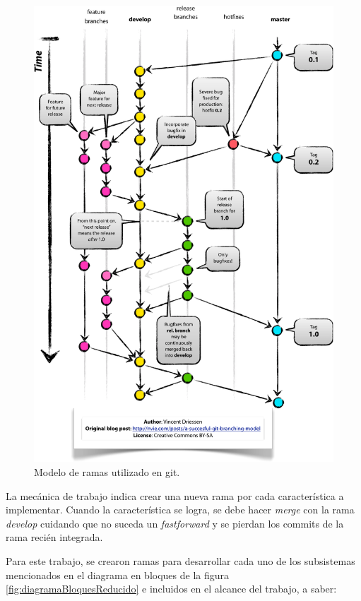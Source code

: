 \begin{figure}[!htbp]
	\centering
	\includegraphics[width=.9\textwidth]{./Figures/Git-branching-model.pdf}
	\caption[Modelo de ramas utilizado en git]{Modelo de ramas utilizado en git\protect\footnotemark.}
	\label{fig:branching}
\end{figure}


La mecánica de trabajo indica crear una nueva rama por cada característica a implementar.  Cuando la característica se logra, se debe hacer \textit{merge} con la rama \textit{develop} cuidando que no suceda un \textit{fastforward} y se pierdan los commits de la rama recién integrada.

Para este trabajo, se crearon ramas para desarrollar cada uno de los subsistemas mencionados en el diagrama en bloques de la figura \ref{fig:diagramaBloquesReducido} e incluidos en el alcance del trabajo, a saber:

